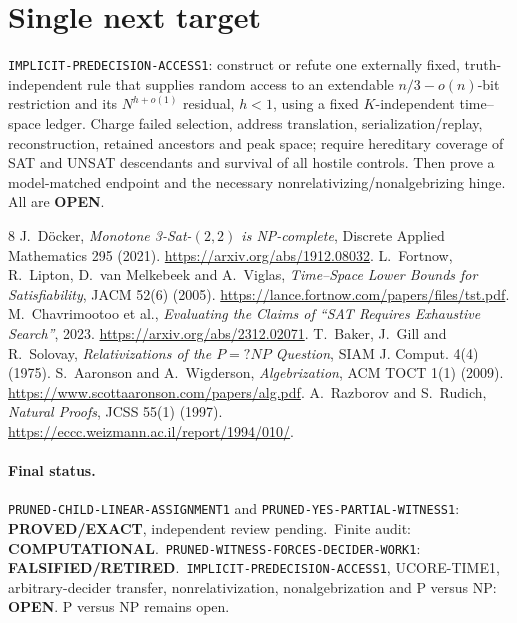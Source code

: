 \documentclass[11pt]{article}
\newcommand{\EXACT}{\textbf{PROVED/EXACT}}
\newcommand{\OPEN}{\textbf{OPEN}}
\newcommand{\RETIRED}{\textbf{FALSIFIED/RETIRED}}
\newcommand{\COMP}{\textbf{COMPUTATIONAL}}
\begin{document}
\section{Single next target}

\texttt{IMPLICIT-PREDECISION-ACCESS1}: construct or refute one externally
fixed, truth-independent rule that supplies random access to an extendable
$n/3-o(n)$-bit restriction and its $N^{h+o(1)}$ residual, $h<1$, using a fixed
$K$-independent time--space ledger.  Charge failed selection, address
translation, serialization/replay, reconstruction, retained ancestors and
peak space; require hereditary coverage of SAT and UNSAT descendants and
survival of all hostile controls.  Then prove a model-matched endpoint and
the necessary nonrelativizing/nonalgebrizing hinge.  All are \OPEN.

\begin{thebibliography}{8}
 J.~D\"ocker, \emph{Monotone 3-Sat-$(2,2)$ is NP-complete},
Discrete Applied Mathematics 295 (2021). \url{https://arxiv.org/abs/1912.08032}.
 L.~Fortnow, R.~Lipton, D.~van Melkebeek and A.~Viglas,
\emph{Time--Space Lower Bounds for Satisfiability}, JACM 52(6) (2005).
\url{https://lance.fortnow.com/papers/files/tst.pdf}.
 M.~Chavrimootoo et al., \emph{Evaluating the Claims of
``SAT Requires Exhaustive Search''}, 2023. \url{https://arxiv.org/abs/2312.02071}.
 T.~Baker, J.~Gill and R.~Solovay, \emph{Relativizations of the
$P=?NP$ Question}, SIAM J. Comput. 4(4) (1975).
 S.~Aaronson and A.~Wigderson, \emph{Algebrization}, ACM TOCT
1(1) (2009). \url{https://www.scottaaronson.com/papers/alg.pdf}.
 A.~Razborov and S.~Rudich, \emph{Natural Proofs}, JCSS 55(1)
(1997). \url{https://eccc.weizmann.ac.il/report/1994/010/}.
\end{thebibliography}

\paragraph{Final status.}
\texttt{PRUNED-CHILD-LINEAR-ASSIGNMENT1} and
\texttt{PRUNED-YES-PARTIAL-WITNESS1}: \EXACT, independent review pending.\
Finite audit: \COMP.\
\texttt{PRUNED-WITNESS-FORCES-DECIDER-WORK1}: \RETIRED.\
\texttt{IMPLICIT-PREDECISION-ACCESS1}, UCORE-TIME1, arbitrary-decider
transfer, nonrelativization, nonalgebrization and P versus NP: \OPEN.
P versus NP remains open.

\end{document}
